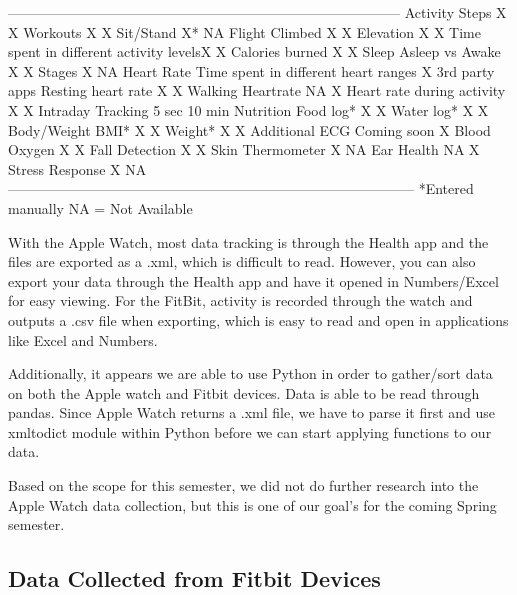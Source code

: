 \documentclass[]{book}
\begin{document}
---------------\textbar{}---------------------------------------\textbar{}---------------\textbar{}---------------
Activity \textbar{}Steps \textbar{}X \textbar{}X
\textbar{}Workouts \textbar{}X \textbar{}X
\textbar{}Sit/Stand \textbar{}X* \textbar{}NA
\textbar{}Flight Climbed \textbar{}X \textbar{}X
\textbar{}Elevation \textbar{}X \textbar{}X
\textbar{}Time spent in different activity levels\textbar{}X \textbar{}X
\textbar{}Calories burned \textbar{}X \textbar{}X
Sleep \textbar{}Asleep vs Awake \textbar{}X \textbar{}X
\textbar{}Stages \textbar{}X \textbar{}NA
Heart Rate \textbar{}Time spent in different heart ranges \textbar{}X \textbar{}3rd party apps
\textbar{}Resting heart rate \textbar{}X \textbar{}X
\textbar{}Walking Heartrate \textbar{}NA \textbar{}X
\textbar{}Heart rate during activity \textbar{}X \textbar{}X
\textbar{}Intraday Tracking \textbar{}5 sec \textbar{}10 min
Nutrition \textbar{}Food log* \textbar{}X \textbar{}X
\textbar{}Water log* \textbar{}X \textbar{}X
Body/Weight \textbar{}BMI* \textbar{}X \textbar{}X
\textbar{}Weight* \textbar{}X \textbar{}X
Additional \textbar{}ECG \textbar{}Coming soon \textbar{}X
\textbar{}Blood Oxygen \textbar{}X \textbar{}X
\textbar{}Fall Detection \textbar{}X \textbar{}X
\textbar{}Skin Thermometer \textbar{}X \textbar{}NA
\textbar{}Ear Health \textbar{}NA \textbar{}X
\textbar{}Stress Response \textbar{}X \textbar{}NA
---------------------------------------------------------------------------------------
*Entered manually
NA = Not Available

With the Apple Watch, most data tracking is through the Health app and the files are exported as a .xml, which is difficult to read. However, you can also export your data through the Health app and have it opened in Numbers/Excel for easy viewing. For the FitBit, activity is recorded through the watch and outputs a .csv file when exporting, which is easy to read and open in applications like Excel and Numbers.

Additionally, it appears we are able to use Python in order to gather/sort data on both the Apple watch and Fitbit devices. Data is able to be read through pandas. Since Apple Watch returns a .xml file, we have to parse it first and use xmltodict module within Python before we can start applying functions to our data.

Based on the scope for this semester, we did not do further research into the Apple Watch data collection, but this is one of our goal's for the coming Spring semester.

\hypertarget{data-collected-from-fitbit-devices}{%
\subsection{Data Collected from Fitbit Devices}\label{data-collected-from-fitbit-devices}}
\end{document}
